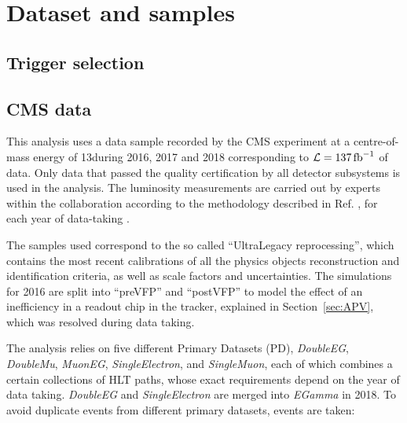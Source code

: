 \section{Dataset and samples}
\label{sec:datasets}

\subsection{Trigger selection}


\subsection{CMS data}
This analysis uses a data sample recorded by the CMS experiment at a centre-of-mass energy of 13\TeV during 2016, 2017 and 2018 corresponding to $\mathcal{L} = 137 \mbox{\ensuremath{\,\text{fb}^{-1}}}$ of data.
Only data that passed the quality certification by all detector subsystems is used in the analysis.
The luminosity measurements are carried out by experts within the collaboration according to the methodology described in Ref. \cite{CMS:LUM-17-003}, for each year of data-taking \cite{CMS:LUM-17-004, CMS:LUM-18-002}.

The samples used correspond to the so called ``UltraLegacy reprocessing'', which contains the most recent calibrations of all the physics objects reconstruction and identification criteria, as well as scale factors and uncertainties.
The simulations for 2016 are split into ``preVFP'' and ``postVFP'' to model the effect
of an inefficiency in a readout chip in the tracker, explained in Section~\ref{sec:APV}, which was resolved during data taking.

The analysis relies on five different Primary Datasets (PD),
{\it DoubleEG}, {\it DoubleMu}, {\it MuonEG}, {\it SingleElectron}, and {\it SingleMuon},
each of which combines a certain collections of HLT paths, whose exact requirements depend on the year of data
taking. {\it DoubleEG} and {\it SingleElectron} are merged into {\it EGamma} in 2018.
To avoid duplicate events from different primary datasets, events are taken:

